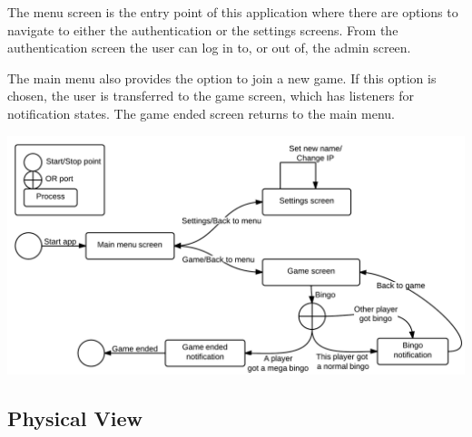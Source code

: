 The menu screen is the entry point of this application where there are options
to navigate to either the authentication or the settings screens. From the
authentication screen the user can log in to, or out of, the admin screen.

The main menu also provides the option to join a new game. If this option is
chosen, the user is transferred to the game screen, which has listeners for
notification states. The game ended screen returns to the main menu.
\begin{center}
\includegraphics[clip=true, width=0.9 \textwidth]{Pikks/ProcessViewFinal.png}
\label{ref:gantt}
\end{center}

\subsection{Physical View}
\begin{center}
\includegraphics[clip=true, width=0.9]{Pikks/PhysicalViewFinal}
\end{center}

